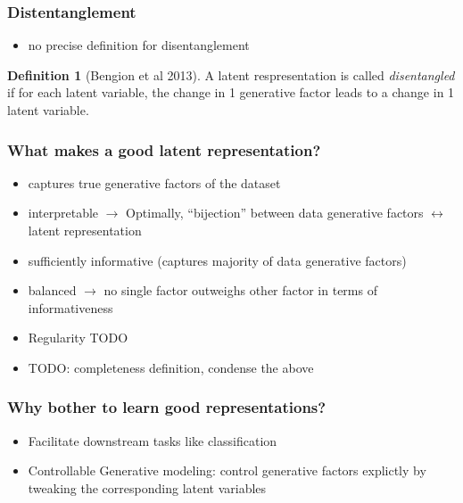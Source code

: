 \documentclass{beamer}
\theoremstyle{definition}
\newtheorem{definition}[section]{Definition}
\begin{document}
      \begin{frame}
        \frametitle{Distentanglement}
        \begin{itemize}
          \item no precise definition for disentanglement
        \end{itemize}
        \begin{definition}[Bengion et al 2013]
          A latent respresentation is called \textit{disentangled} if for each latent variable, the change in 1 generative factor leads to a change in 1 latent variable.
        \end{definition}
      \end{frame}

    \begin{frame}
      \frametitle{What makes a good latent representation?}
      \begin{itemize}
        \item captures true generative factors of the dataset
        \item interpretable $\rightarrow$ Optimally, \enquote{bijection} between data generative factors $\leftrightarrow$ latent representation
        \item sufficiently informative (captures majority of data generative factors)
        \item balanced $\to$ no single factor outweighs other factor in terms of informativeness
        \item Regularity TODO
        \item TODO: completeness definition, condense the above
      \end{itemize}
    \end{frame}

    \begin{frame}
        \frametitle{Why bother to learn good representations?}
        \begin{itemize}
          \item Facilitate downstream tasks like classification
          \item Controllable Generative modeling: control generative factors explictly by tweaking the corresponding latent variables
        \end{itemize}
      \end{frame}
\end{document}
